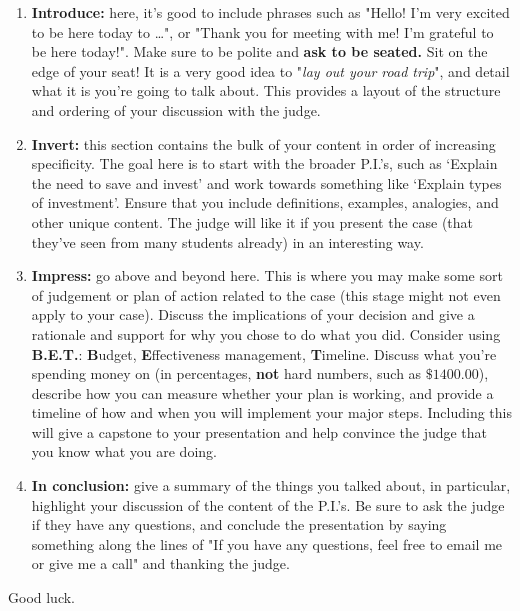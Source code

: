 \documentclass[12pt]{article}
\begin{document}
\begin{enumerate}
	\item \textbf{Introduce:} here, it's good to include phrases such as "Hello! I'm very excited to be here today to \ldots ", or "Thank you for meeting with me! I'm grateful to be here today!". Make sure to be polite and \textbf{ask to be seated.} Sit on the edge of your seat! It is a very good idea to "\textit{lay out your road trip}", and detail what it is you're going to talk about. This provides a layout of the structure and ordering of your discussion with the judge.

	\item \textbf{Invert:} this section contains the bulk of your content in order of increasing specificity. The goal here is to start with the broader P.I.'s, such as \lq Explain the need to save and invest' and work towards something like \lq Explain types of investment'. Ensure that you include definitions, examples, analogies, and other unique content. The judge will like it if you present the case (that they've seen from many students already) in an interesting way. 
	
	\item \textbf{Impress:} go above and beyond here. This is where you may make some sort of judgement or plan of action related to the case (this stage might not even apply to your case). Discuss the implications of your decision and give a rationale and support for why you chose to do what you did. Consider using \textbf{B.E.T.}: \textbf{B}udget, \textbf{E}ffectiveness management, \textbf{T}imeline. Discuss what you're spending money on (in percentages, \textbf{not} hard numbers, such as $\$1400.00$), describe how you can measure whether your plan is working, and provide a timeline of how and when you will implement your major steps. Including this will give a capstone to your presentation and help convince the judge that you know what you are doing.
	
	\item \textbf{In conclusion:} give a summary of the things you talked about, in particular, highlight your discussion of the content of the P.I.'s. Be sure to ask the judge if they have any questions, and conclude the presentation by saying something along the lines of "If you have any questions, feel free to email me or give me a call" and thanking the judge.
	
\end{enumerate}

\begin{center}
 Good luck.
\end{center}
\end{document}
